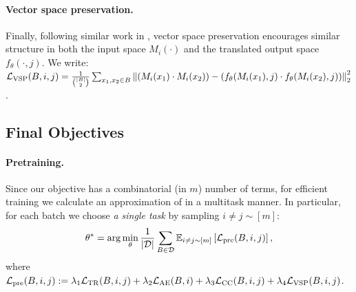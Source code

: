 \paragraph{Vector space preservation.} Finally, following similar work in \citet{mrksic2016counterfitting, anonymous2024embeddingconverter},
vector space preservation encourages similar structure in both the input space $M_i(\cdot)$ and the translated output space $f_{\theta}(\cdot, j)$. We write:
$\mathcal{L}_{\rm{VSP}}(B,i,j) = \frac{1}{\binom{|B|}{2}}\sum_{x_1, x_2 \in B}\left\| (M_i(x_1) \cdot M_i(x_2)) - (f_{\theta}(M_i(x_1), j) \cdot f_{\theta}(M_i(x_2), j)) \right\|_2^2$.


\subsection{Final Objectives} \label{sec:final_losses}
\paragraph{Pretraining.} Since our objective has a combinatorial (in $m$) number of terms, for efficient training we calculate an approximation of  in a multitask manner. In particular, for each batch we choose \textit{a single task} by sampling $i \neq j \sim [m]$: 
\begin{equation}
\theta^* = \arg \min_\theta \frac{1}{|\mathcal{D}|}\sum_{B\in\mathcal{D}}\mathbb{E}_{i \neq j\sim[m]}\left[\mathcal{L}_{\rm pre}(B, i, j)\right],
\end{equation}
where $\mathcal{L}_{\rm pre}(B, i, j) := \lambda_{1} \mathcal{L}_{\rm{TR}}(B, i, j) + \lambda_{2} \mathcal{L}_{\rm{AE}}(B, i) + \lambda_{3} \mathcal{L}_{\rm{CC}}(B, i, j) + \lambda_{4}\mathcal{L}_{\rm{VSP}}(B, i, j)$.
